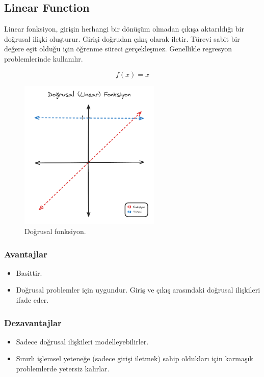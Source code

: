 \newpage

\subsection{Linear Function}
Linear fonksiyon, girişin herhangi bir dönüşüm olmadan çıkışa aktarıldığı bir doğrusal ilişki oluşturur. Girişi doğrudan çıkış olarak iletir. Türevi sabit bir değere eşit olduğu için öğrenme süreci gerçekleşmez. Genellikle regresyon problemlerinde kullanılır.

\[f(x) = x\]

\begin{figure}[h]
    \centering
    \includegraphics[width=0.6\textwidth]{images/linear_function.png}
    \caption{Doğrusal fonksiyon.}
    \label{fig:enter-label}
\end{figure}

\subsubsection{Avantajlar}
\begin{itemize}
    \item Basittir.
    \item Doğrusal problemler için uygundur. Giriş ve çıkış arasındaki doğrusal ilişkileri ifade eder.
\end{itemize}

\subsubsection{Dezavantajlar}
\begin{itemize}
    \item Sadece doğrusal ilişkileri modelleyebilirler.
    \item Sınırlı işlemsel yeteneğe (sadece girişi iletmek) sahip oldukları için karmaşık problemlerde yetersiz kalırlar.
\end{itemize}

